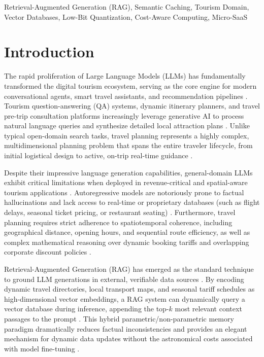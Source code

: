 \documentclass{ieeeaccess}
\begin{document}
\begin{keywords}
Retrieval-Augmented Generation (RAG),
Semantic Caching,
Tourism Domain,
Vector Databases,
Low-Bit Quantization,
Cost-Aware Computing,
Micro-SaaS
\end{keywords}

\titlepgskip=-15pt

\maketitle

\section{Introduction}
\label{sec:introduction}
The rapid proliferation of Large Language Models (LLMs) has fundamentally transformed the digital tourism ecosystem, serving as the core engine for modern conversational agents, smart travel assistants, and recommendation pipelines \cite{lewis-rag-2020, gao-rag-survey-2023}. Tourism question-answering (QA) systems, dynamic itinerary planners, and travel pre-trip consultation platforms increasingly leverage generative AI to process natural language queries and synthesize detailed local attraction plans \cite{tourllm-2024, qi-lettot-2025}. Unlike typical open-domain search tasks, travel planning represents a highly complex, multidimensional planning problem that spans the entire traveler lifecycle, from initial logistical design to active, on-trip real-time guidance \cite{qi-lettot-2025, ni-tprag-2025}.

Despite their impressive language generation capabilities, general-domain LLMs exhibit critical limitations when deployed in revenue-critical and spatial-aware tourism applications \cite{qi-lettot-2025, pricinglogic-2024}. Autoregressive models are notoriously prone to factual hallucinations and lack access to real-time or proprietary databases (such as flight delays, seasonal ticket pricing, or restaurant seating) \cite{lewis-rag-2020, enhancing-recommender-2024}. Furthermore, travel planning requires strict adherence to spatiotemporal coherence, including geographical distance, opening hours, and sequential route efficiency, as well as complex mathematical reasoning over dynamic booking tariffs and overlapping corporate discount policies \cite{qi-lettot-2025, ni-tprag-2025, pricinglogic-2024}.

Retrieval-Augmented Generation (RAG) has emerged as the standard technique to ground LLM generations in external, verifiable data sources \cite{lewis-rag-2020, gao-survey-2024}. By encoding dynamic travel directories, local transport maps, and seasonal tariff schedules as high-dimensional vector embeddings, a RAG system can dynamically query a vector database during inference, appending the top-$k$ most relevant context passages to the prompt \cite{lewis-rag-2020, leveraging-approx-2025}. This hybrid parametric/non-parametric memory paradigm dramatically reduces factual inconsistencies and provides an elegant mechanism for dynamic data updates without the astronomical costs associated with model fine-tuning \cite{lewis-rag-2020, gao-survey-2024}.
\end{document}
